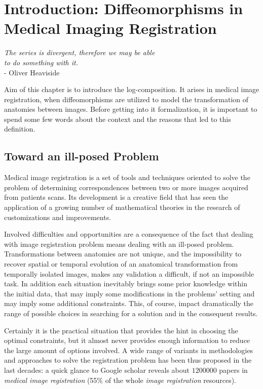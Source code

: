 \chapter{Introduction: Diffeomorphisms in Medical Imaging Registration}\label{ch:introduction}


\begin{flushright}
		\emph{The series is divergent, therefore we may be able \\ to do something with it.}\\
			- Oliver Heaviside
\end{flushright}

\vspace{0.6cm}


Aim of this chapter is to introduce the log-composition. It arises in medical image registration, when diffeomorphisms are utilized to model the transformation of anatomies between images. Before getting into it formalization, it is important to spend some few words about the context and the reasons that led to this definition. 

\section{Toward an ill-posed Problem}
Medical image registration is a set of tools and techniques oriented to solve the problem of determining correspondences between two or more images acquired from patients scans. Its development is a creative field that has seen the application of a growing number of mathematical theories in the research of customizations and improvements.

Involved difficulties and opportunities are a consequence of the fact that dealing with image registration problem means dealing with an ill-posed problem. Transformations between anatomies are not unique, and the impossibility to recover spatial or temporal evolution of an anatomical transformation from temporally isolated images, makes any validation a difficult, if not an impossible task. 
In addition each situation inevitably brings some prior knowledge within the initial data, that may imply some modifications in the problems' setting and may imply some additional constraints. This, of course, impact dramatically the range of possible choices in searching for a solution and in the consequent results. 

Certainly it is the practical situation that provides the hint in choosing the optimal constraints, but it almost never provides enough information to reduce the large amount of options involved. A wide range of variants in methodologies and approaches to solve the registration problem has been thus proposed in the last decades: a quick glance to Google scholar reveals about $1200000$ papers in \emph{medical image registration} (55\% of the whole \emph{image registration} resources). 

